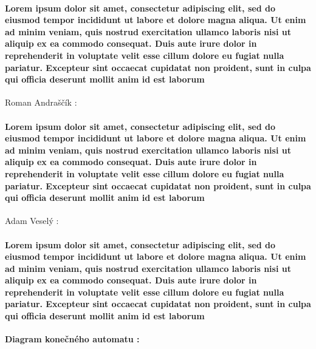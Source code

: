 \documentclass[12pt]{article}
\begin{document}
\paragraph{Lorem ipsum dolor sit amet, consectetur adipiscing elit, sed do eiusmod tempor incididunt ut labore et dolore magna aliqua. Ut enim ad minim veniam, quis nostrud exercitation ullamco laboris nisi ut aliquip ex ea commodo consequat. Duis aute irure dolor in reprehenderit in voluptate velit esse cillum dolore eu fugiat nulla pariatur. Excepteur sint occaecat cupidatat non proident, sunt in culpa qui officia deserunt mollit anim id est laborum \newline \\}
\large Roman Andraščík :
\normalsize
\paragraph{Lorem ipsum dolor sit amet, consectetur adipiscing elit, sed do eiusmod tempor incididunt ut labore et dolore magna aliqua. Ut enim ad minim veniam, quis nostrud exercitation ullamco laboris nisi ut aliquip ex ea commodo consequat. Duis aute irure dolor in reprehenderit in voluptate velit esse cillum dolore eu fugiat nulla pariatur. Excepteur sint occaecat cupidatat non proident, sunt in culpa qui officia deserunt mollit anim id est laborum \newline \\}
\large Adam Veselý :
\normalsize
\paragraph{Lorem ipsum dolor sit amet, consectetur adipiscing elit, sed do eiusmod tempor incididunt ut labore et dolore magna aliqua. Ut enim ad minim veniam, quis nostrud exercitation ullamco laboris nisi ut aliquip ex ea commodo consequat. Duis aute irure dolor in reprehenderit in voluptate velit esse cillum dolore eu fugiat nulla pariatur. Excepteur sint occaecat cupidatat non proident, sunt in culpa qui officia deserunt mollit anim id est laborum \newline \\}
 
\newpage

\noindent \Large \textbf{Diagram konečného automatu :}
\newline \\
\end{document}
